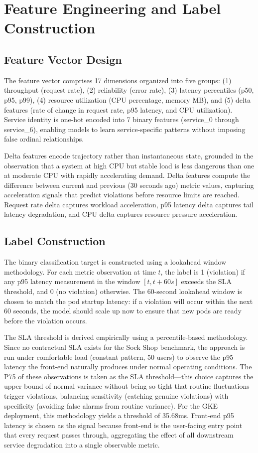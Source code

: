 \documentclass[conference]{IEEEtran}
\begin{document}
\section{Feature Engineering and Label Construction}

\subsection{Feature Vector Design}

The feature vector comprises 17 dimensions organized into five groups: (1) throughput (request rate), (2) reliability (error rate), (3) latency percentiles (p50, p95, p99), (4) resource utilization (CPU percentage, memory MB), and (5) delta features (rate of change in request rate, p95 latency, and CPU utilization). Service identity is one-hot encoded into 7 binary features (service\_0 through service\_6), enabling models to learn service-specific patterns without imposing false ordinal relationships.

Delta features encode trajectory rather than instantaneous state, grounded in the observation that a system at high CPU but stable load is less dangerous than one at moderate CPU with rapidly accelerating demand. Delta features compute the difference between current and previous (30 seconds ago) metric values, capturing acceleration signals that predict violations before resource limits are reached. Request rate delta captures workload acceleration, p95 latency delta captures tail latency degradation, and CPU delta captures resource pressure acceleration.

\subsection{Label Construction}

The binary classification target is constructed using a lookahead window methodology. For each metric observation at time $t$, the label is 1 (violation) if any p95 latency measurement in the window $[t, t+60s]$ exceeds the SLA threshold, and 0 (no violation) otherwise. The 60-second lookahead window is chosen to match the pod startup latency: if a violation will occur within the next 60 seconds, the model should scale up now to ensure that new pods are ready before the violation occurs.

The SLA threshold is derived empirically using a percentile-based methodology. Since no contractual SLA exists for the Sock Shop benchmark, the approach is run under comfortable load (constant pattern, 50 users) to observe the p95 latency the front-end naturally produces under normal operating conditions. The P75 of these observations is taken as the SLA threshold---this choice captures the upper bound of normal variance without being so tight that routine fluctuations trigger violations, balancing sensitivity (catching genuine violations) with specificity (avoiding false alarms from routine variance). For the GKE deployment, this methodology yields a threshold of 35.68ms. Front-end p95 latency is chosen as the signal because front-end is the user-facing entry point that every request passes through, aggregating the effect of all downstream service degradation into a single observable metric.
\end{document}
